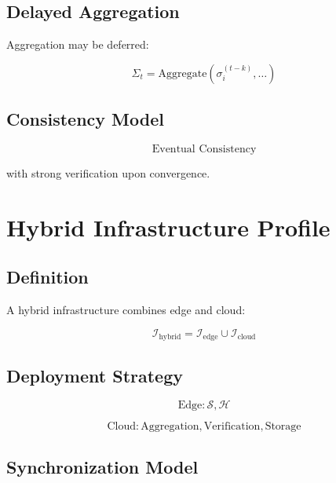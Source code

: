 \subsection{Delayed Aggregation}

Aggregation may be deferred:

\begin{equation}
\Sigma_t = \text{Aggregate}(\sigma_i^{(t-k)}, \dots)
\end{equation}

\subsection{Consistency Model}

\begin{equation}
\text{Eventual Consistency}
\end{equation}

with strong verification upon convergence.

\section{Hybrid Infrastructure Profile}

\subsection{Definition}

A hybrid infrastructure combines edge and cloud:

\begin{equation}
\mathcal{I}_{\text{hybrid}} = \mathcal{I}_{\text{edge}} \cup \mathcal{I}_{\text{cloud}}
\end{equation}

\subsection{Deployment Strategy}

\begin{equation}
\text{Edge}: \mathcal{S}, \mathcal{H}
\end{equation}

\begin{equation}
\text{Cloud}: \text{Aggregation}, \text{Verification}, \text{Storage}
\end{equation}

\subsection{Synchronization Model}

